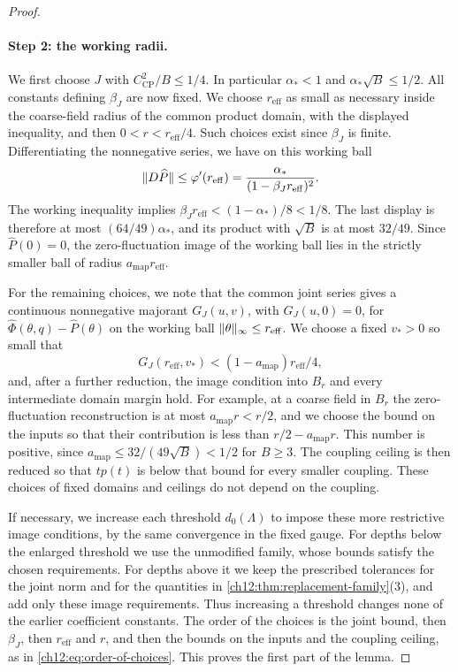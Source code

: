 \begin{proof}
\paragraph{Step 2: the working radii.}
We first choose $J$ with $C_{\mathrm{CP}}^2/B\le1/4$. In particular $\alpha_*<1$ and $\alpha_*\sqrt B\le1/2$. All constants defining $\beta_J$ are now fixed. We choose $r_{\mathrm{eff}}$ as small as necessary inside the coarse-field radius of the common product domain, with the displayed inequality, and then $0<r<r_{\mathrm{eff}}/4$. Such choices exist since $\beta_J$ is finite. Differentiating the nonnegative series, we have on this working ball
\[
 \lVert D\widehat P\rVert\le\varphi'(r_{\mathrm{eff}})=\frac{\alpha_*}{(1-\beta_Jr_{\mathrm{eff}})^2}.
\]
The working inequality implies $\beta_Jr_{\mathrm{eff}}<(1-\alpha_*)/8<1/8$. The last display is therefore at most $(64/49)\alpha_*$, and its product with $\sqrt B$ is at most $32/49$. Since $\widehat P(0)=0$, the zero-fluctuation image of the working ball lies in the strictly smaller ball of radius $a_{\mathrm{map}}r_{\mathrm{eff}}$.

For the remaining choices, we note that the common joint series gives a continuous nonnegative majorant $G_J(u,v)$, with $G_J(u,0)=0$, for $\widehat\Phi(\theta,q)-\widehat P(\theta)$ on the working ball $\lVert \theta\rVert_\infty\le r_{\mathrm{eff}}$. We choose a fixed $v_*>0$ so small that
\[
 G_J(r_{\mathrm{eff}},v_*)<(1-a_{\mathrm{map}})r_{\mathrm{eff}}/4,
\]
and, after a further reduction, the image condition into $B_r$ and every intermediate domain margin hold. For example, at a coarse field in $B_r$ the zero-fluctuation reconstruction is at most $a_{\mathrm{map}}r<r/2$, and we choose the bound on the inputs so that their contribution is less than $r/2-a_{\mathrm{map}}r$. This number is positive, since $a_{\mathrm{map}}\le32/(49\sqrt B)<1/2$ for $B\ge3$. The coupling ceiling is then reduced so that $tp(t)$ is below that bound for every smaller coupling. These choices of fixed domains and ceilings do not depend on the coupling.

If necessary, we increase each threshold $d_0(\Lambda)$ to impose these more restrictive image conditions, by the same convergence in the fixed gauge. For depths below the enlarged threshold we use the unmodified family, whose bounds satisfy the chosen requirements. For depths above it we keep the prescribed tolerances for the joint norm and for the quantities in \cref{ch12:thm:replacement-family}(3), and add only these image requirements. Thus increasing a threshold changes none of the earlier coefficient constants. The order of the choices is the joint bound, then $\beta_J$, then $r_{\mathrm{eff}}$ and $r$, and then the bounds on the inputs and the coupling ceiling, as in \eqref{ch12:eq:order-of-choices}. This proves the first part of the lemma.


\end{proof}
